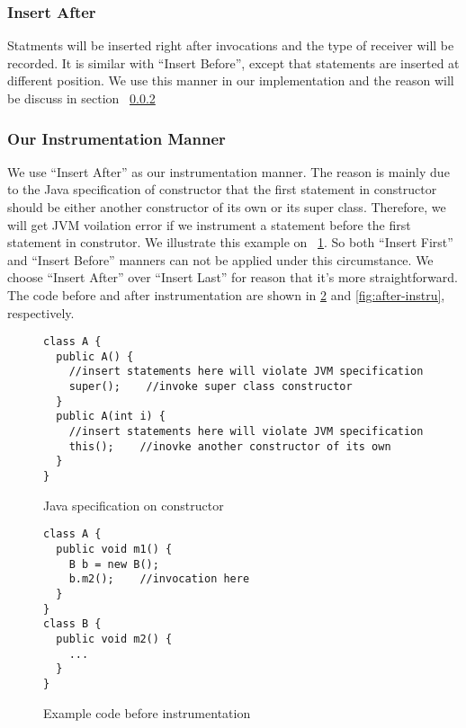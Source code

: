 \documentclass{fac}
\begin{document}
\subsubsection{Insert After}\label{subsubsec:insert-after}
Statments will be inserted right after invocations and the type of receiver will be recorded. It is similar with ``Insert Before'', except that statements are inserted at different position. We use this manner in our implementation and the reason will be discuss in section ~\ref{subsubsec:instrument}
\subsubsection{Our Instrumentation Manner}\label{subsubsec:instrument}
We use ``Insert After'' as our instrumentation manner. The reason is mainly due to the Java specification of constructor that the first statement in constructor should be either another constructor of its own or its super class. Therefore, we will get JVM voilation error if we instrument a statement before the first statement in construtor. We illustrate this example on ~\ref{fig:spec-constructor}. So both ``Insert First'' and ``Insert Before'' manners can not be applied under this circumstance. We choose ``Insert After'' over ``Insert Last'' for reason that it's more straightforward. The code before and after instrumentation are shown in \ref{fig:before-instru} and \ref{fig:after-instru}, respectively.

\begin{figure}
\begin{lstlisting}
class A {
  public A() {
    //insert statements here will violate JVM specification
    super();	//invoke super class constructor
  }
  public A(int i) {
    //insert statements here will violate JVM specification
    this();    //inovke another constructor of its own
  }
}
\end{lstlisting}
\caption{Java specification on constructor}
\label{fig:spec-constructor}
\end{figure}

\begin{figure}
\centering
\begin{lstlisting}
class A {
  public void m1() {
    B b = new B();
    b.m2();    //invocation here
  }
}
class B {
  public void m2() {
    ...
  }
}
\end{lstlisting}
\caption{Example code before instrumentation}
\label{fig:before-instru}
\end{figure}
\end{document}
